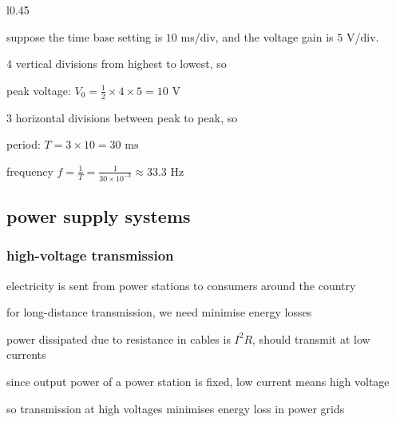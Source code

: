 \label{ex-readcro}

\begin{wrapfigure}{l}{0.45\linewidth}
\centering
{}
\end{wrapfigure}



suppose the time base setting is $10$ ms/div, and the voltage gain is $5$ V/div.
 
4 vertical divisions from highest to lowest, so

\phantom{++} peak voltage: $V_0= \frac{1}{2} \times 4 \times 5 = 10 \text{ V}$

3 horizontal divisions between peak to peak, so

\phantom{++}  period: $T = 3 \times 10 = 30 \text{ ms}$
	
\phantom{++}  frequency $f = \frac{1}{T} = \frac{1}{30\times10^{-3}} \approx 33.3 \text{ Hz} $ \eoe






\subsection{power supply systems}

\subsubsection{high-voltage transmission}

electricity is sent from power stations to consumers around the country

for long-distance transmission, we need minimise energy losses 

power dissipated due to resistance in cables is $I^2 R$, should transmit at low currents

since output power of a power station is fixed, low current means high voltage

so transmission at high voltages minimises energy loss in power grids

